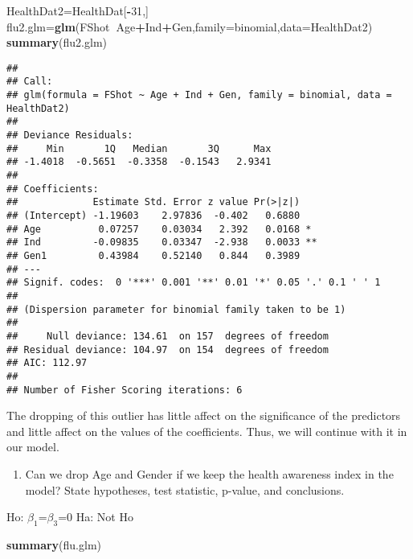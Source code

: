 \documentclass[]{article}
\newenvironment{Shaded}{\begin{snugshade}}{\end{snugshade}}
\newcommand{\KeywordTok}[1]{\textcolor[rgb]{0.13,0.29,0.53}{\textbf{#1}}}
\newcommand{\DataTypeTok}[1]{\textcolor[rgb]{0.13,0.29,0.53}{#1}}
\newcommand{\DecValTok}[1]{\textcolor[rgb]{0.00,0.00,0.81}{#1}}
\newcommand{\OperatorTok}[1]{\textcolor[rgb]{0.81,0.36,0.00}{\textbf{#1}}}
\newcommand{\NormalTok}[1]{#1}
\providecommand{\tightlist}{%
  \setlength{\itemsep}{0pt}\setlength{\parskip}{0pt}}
\begin{document}
\begin{Shaded}
\begin{Highlighting}[]
\NormalTok{HealthDat2=HealthDat[}\OperatorTok{-}\DecValTok{31}\NormalTok{,]}
\NormalTok{flu2.glm=}\KeywordTok{glm}\NormalTok{(FShot}\OperatorTok{~}\NormalTok{Age}\OperatorTok{+}\NormalTok{Ind}\OperatorTok{+}\NormalTok{Gen,}\DataTypeTok{family=}\NormalTok{binomial,}\DataTypeTok{data=}\NormalTok{HealthDat2)}
\KeywordTok{summary}\NormalTok{(flu2.glm)}
\end{Highlighting}
\end{Shaded}

\begin{verbatim}
## 
## Call:
## glm(formula = FShot ~ Age + Ind + Gen, family = binomial, data = HealthDat2)
## 
## Deviance Residuals: 
##     Min       1Q   Median       3Q      Max  
## -1.4018  -0.5651  -0.3358  -0.1543   2.9341  
## 
## Coefficients:
##             Estimate Std. Error z value Pr(>|z|)   
## (Intercept) -1.19603    2.97836  -0.402   0.6880   
## Age          0.07257    0.03034   2.392   0.0168 * 
## Ind         -0.09835    0.03347  -2.938   0.0033 **
## Gen1         0.43984    0.52140   0.844   0.3989   
## ---
## Signif. codes:  0 '***' 0.001 '**' 0.01 '*' 0.05 '.' 0.1 ' ' 1
## 
## (Dispersion parameter for binomial family taken to be 1)
## 
##     Null deviance: 134.61  on 157  degrees of freedom
## Residual deviance: 104.97  on 154  degrees of freedom
## AIC: 112.97
## 
## Number of Fisher Scoring iterations: 6
\end{verbatim}

The dropping of this outlier has little affect on the significance of
the predictors and little affect on the values of the coefficients.
Thus, we will continue with it in our model.

\begin{enumerate}
\def\labelenumi{\Alph{enumi})}
\setcounter{enumi}{5}
\tightlist
\item
  Can we drop Age and Gender if we keep the health awareness index in
  the model? State hypotheses, test statistic, p-value, and conclusions.
\end{enumerate}

Ho: \(\beta_1\)=\(\beta_3\)=0 Ha: Not Ho

\begin{Shaded}
\begin{Highlighting}[]
\KeywordTok{summary}\NormalTok{(flu.glm)}
\end{Highlighting}
\end{Shaded}
\end{document}
